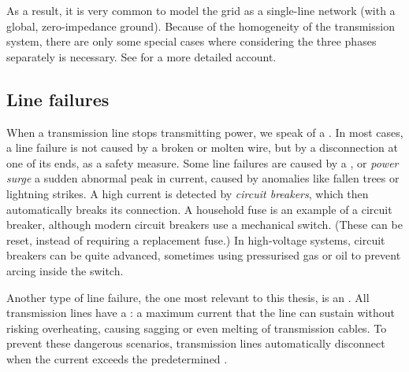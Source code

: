 \documentclass[main.tex]{subfiles}
\begin{document}
As a result, it is very common to model the grid as a single-line network (with a global, zero-impedance ground). Because of the homogeneity of the transmission system, there are only some special cases where considering the three phases separately is necessary. See \cite{Kirtley2010} for a more detailed account.

\subsection{Line failures}\label{sec:linefailures}
When a transmission line stops transmitting power, we speak of a . In most cases, a line failure is not caused by a broken or molten wire, but by a disconnection at one of its ends, as a safety measure. 
Some line failures are caused by a , or \emph{power surge} a sudden abnormal peak in current, caused by anomalies like fallen trees or lightning strikes. A high current is detected by \emph{circuit breakers}, which then automatically breaks its connection. A household fuse is an example of a circuit breaker, although modern circuit breakers use a mechanical switch. (These can be reset, instead of requiring a replacement fuse.) In high-voltage systems, circuit breakers can be quite advanced, sometimes using pressurised gas or oil to prevent arcing inside the switch.

Another type of line failure, the one most relevant to this thesis, is an . All transmission lines have a : a maximum current that the line can sustain without risking overheating, causing sagging or even melting of transmission cables. To prevent these dangerous scenarios, transmission lines automatically disconnect when the current exceeds the predetermined .%
\end{document}
